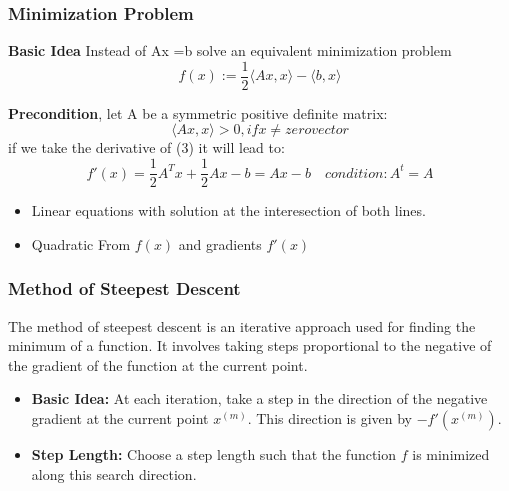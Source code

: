 \documentclass[unicode,11pt,a4paper,oneside,numbers=endperiod,openany]{scrartcl}
\begin{document}
\subsubsection{Minimization Problem}
\begin{itemize}
 \item {\textbf{Basic Idea}\newline
 Instead of Ax =b solve an equivalent minimization problem \[f(x) := \frac{1}{2}\langle Ax,x \rangle -\langle b,x\rangle\]
 \item{\textbf{Precondition}, let A be a symmetric positive definite matrix: \newline
 \[
  \langle Ax,x\rangle >0, if x \neq zero vector
 \]
 if we take the derivative of (3) it will lead to: \[
                                                    f'(x) = \frac{1}{2}A^Tx+\frac{1}{2} Ax-b = Ax-b \quad condition: A^t=A\]
}
}
\end{itemize}

\begin{itemize}
 \item Linear equations with solution at the interesection of both lines.
 \item Quadratic From $f(x)$ and gradients $f'(x)$
\end{itemize}

\subsubsection{Method of Steepest Descent}

The method of steepest descent is an iterative approach used for finding the minimum of a function. It involves taking steps proportional to the negative of the gradient of the function at the current point.

\begin{itemize}
    \item \textbf{Basic Idea:} At each iteration, take a step in the direction of the negative gradient at the current point \( x^{(m)} \). This direction is given by \( -f'(x^{(m)}) \).

    \item \textbf{Step Length:} Choose a step length such that the function \( f \) is minimized along this search direction.
\end{itemize}
\end{document}
